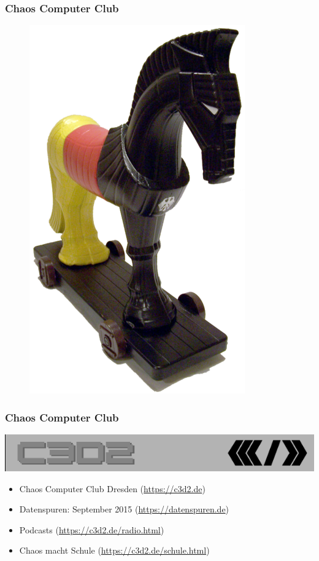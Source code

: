 \documentclass[12pt]{beamer}
\begin{document}
\begin{frame}
  \frametitle{Chaos Computer Club}
  \begin{figure}
    \includegraphics[height=0.7\textheight]{img/trojaner.png}
  \end{figure}
\end{frame}

\begin{frame}
    \frametitle{Chaos Computer Club}
    \begin{center}
	\includegraphics[height=0.1\textheight]{img/c3d2_logo.png}
    \end{center}
    \begin{itemize}
      \item<1-> Chaos Computer Club Dresden (\url{https://c3d2.de})          
      \item<2-> Datenspuren: September 2015 (\url{https://datenspuren.de})
      \item<3-> Podcasts (\url{https://c3d2.de/radio.html})
      \item<4-> Chaos macht Schule (\url{https://c3d2.de/schule.html})
    \end{itemize}
\end{frame}
\end{document}
